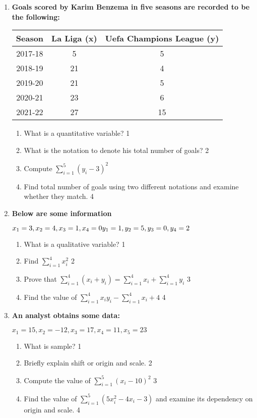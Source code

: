 \documentclass[a4paper,oneside]{book}
\begin{document}
\begin{enumerate}
   \item
	  \textbf{Goals scored by Karim Benzema in five seasons are recorded to be the following:} 
	  
	  \begin{table}[h]
	  \centering
\begin{tabular}{c|c|c}
Season & La Liga (x) & Uefa Champions League (y) \\ \hline
2017-18 & 5 & 5 \\ 
2018-19 & 21 & 4 \\
2019-20 & 21 & 5 \\
2020-21 & 23 & 6 \\ 
2021-22 & 27 & 15 \\ \hline
\end{tabular}
\end{table}
  
  \begin{enumerate}
    \item
	What is a quantitative variable? \hfill 1
    \item
	What is the notation to denote his total number of goals? \hfill 2
    \item  
	Compute $\displaystyle \sum_{i=1}^5 (y_i - 3)^2$ \hfill 
    \item
	Find total number of goals using two different notations and examine whether they match. \hfill 4
  \end{enumerate}

  
 \item
	  \textbf{Below are some information} 
  
  $x_1=3, x_2=4, x_3=1, x_4=0 \\
	  y_1=1, y_2=5, y_3=0, y_4=2$
  
  \begin{enumerate}
    \item
	What is a qualitative variable? \hfill 1
    \item
	Find $\displaystyle \sum_{i=1}^{4}x_i^2$ \hfill 2
    \item  
	Prove that $\displaystyle \sum_{i=1}^{4} (x_i+y_i) = \sum_{i=1}^{4}x_i + \sum_{i=1}^{4}y_i $ \hfill 3
    \item
	Find the value of $\displaystyle \sum_{i=1}^{4} x_iy_i-\sum_{i=1}^{4} x_i+4$ \hfill 4

  \end{enumerate}
  
   \item
	  \textbf{An analyst obtains some data:}
	  \begin{center}
	  $x_1=15, x_2=-12, x_3=17, x_4=11, x_5=23$
  \end{center}
  \begin{enumerate}
    \item
	What is sample? \hfill 1
    \item
	Briefly explain shift or origin and scale. \hfill 2
    \item  
	Compute the value of $\displaystyle \sum_{i=1}^5 (x_i-10)^2$ \hfill 3
    \item
	Find the value of $\displaystyle \sum_{i=1}^5 (5x_i^2-4x_i-3)$ and examine its dependency on origin and scale. \hfill 4
  \end{enumerate}


\end{enumerate}
\end{document}
